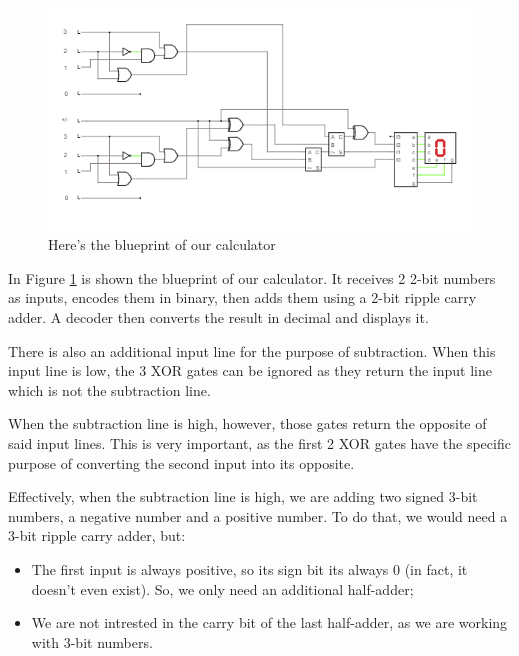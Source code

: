 \documentclass{article}
\begin{document}
\begin{figure}[h]
  \centering
  \includegraphics[scale=0.7]{real_calculator_blueprint}
  \caption{Here's the blueprint of our calculator}
  \label{real_calculator_blueprint}
\end{figure}

In Figure \ref{real_calculator_blueprint} is shown the blueprint of our calculator. It receives 2 2-bit numbers as inputs, encodes them in binary, then adds them using a 2-bit ripple carry adder. A decoder then converts the result in decimal and displays it.

\vspace{5mm}

There is also an additional input line for the purpose of subtraction. When this input line is low, the 3 XOR gates can be ignored as they return the input line which is not the subtraction line.

When the subtraction line is high, however, those gates return the opposite of said input lines. This is very important, as the first 2 XOR gates have the specific purpose of converting the second input into its opposite.

Effectively, when the subtraction line is high, we are adding two signed 3-bit numbers, a negative number and a positive number. To do that, we would need a 3-bit ripple carry adder, but:

\begin{itemize}
  \item The first input is always positive, so its sign bit its always 0 (in fact, it doesn't even exist). So, we only need an additional half-adder;
  \item We are not intrested in the carry bit of the last half-adder, as we are working with 3-bit numbers.
\end{itemize}
\end{document}
